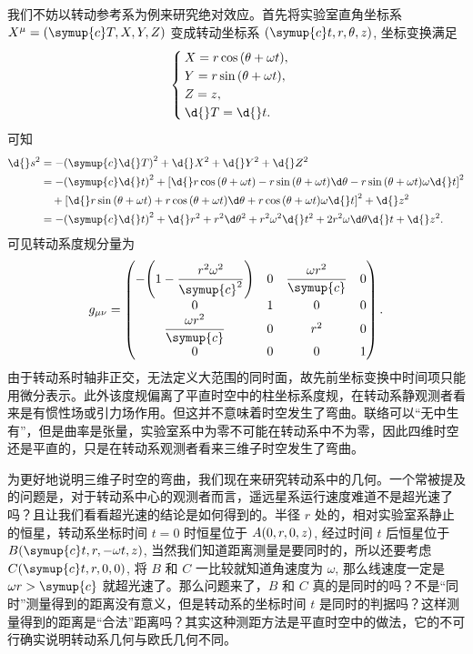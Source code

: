 \documentclass[UTF8, 12pt, a4paper, oneside, onecolumn, fontset=none]{ctexart}
\begin{document}
我们不妨以转动参考系为例来研究绝对效应。首先将实验室直角坐标系 $X^{\mu}=\mleft(\symup{c}T, X, Y, Z\mright)$ 变成转动坐标系 $\mleft(\symup{c}t, r,\theta, z\mright)$, 坐标变换满足
\begin{equation}
\begin{cases}
X=r\cos{\mleft(\theta+\omega t\mright)},\\
Y=r\sin{\mleft(\theta+\omega t\mright)},\\
Z=z,\\
\d{}T=\d{}t.
\end{cases}
\end{equation}
可知
\begin{align}
\d{}s^{2}&=-\mleft(\symup{c}\d{}T\mright)^{2}+\d{}X^{2}+\d{}Y^{2}+\d{}Z^{2}\notag\\
&=-\mleft(\symup{c}\d{}t\mright)^{2}+\mleft[\d{}r\cos{\mleft(\theta+\omega{}t\mright)}-r\sin{\mleft(\theta+\omega{}t\mright)}\d\theta-r\sin{\mleft(\theta+\omega{}t\mright)}\omega\d{}t\mright]^{2}\notag\\
&\quad+\mleft[\d{}r\sin{\mleft(\theta+\omega{}t\mright)}+r\cos{\mleft(\theta+\omega{}t\mright)}\d\theta+r\cos{\mleft(\theta+\omega t\mright)}\omega\d{}t\mright]^{2}+\d{}z^{2}\notag\\
&=-\mleft(\symup{c}\d{}t\mright)^{2}+\d{}r^{2}+r^{2}\d\theta^{2}+r^{2}\omega^{2}\d{} t^{2}+2r^{2}\omega\d\theta\d{}t+\d{}z^{2}.
\end{align}
可见转动系度规分量为
\begin{equation}
g_{\mu\nu}=\begin{pmatrix}
-\mleft(1-\dfrac{r^{2}\omega^{2}}{\symup{c}^{2}}\mright) & 0 & \dfrac{\omega r^{2}}{\symup{c}} & 0\\
0 & 1 & 0 & 0\\
\dfrac{\omega r^{2}}{\symup{c}} & 0 & r^{2} & 0\\
0 & 0 & 0 & 1\\
\end{pmatrix}.
\end{equation}
由于转动系时轴非正交，无法定义大范围的同时面，故先前坐标变换中时间项只能用微分表示。此外该度规偏离了平直时空中的柱坐标系度规，在转动系静观测者看来是有惯性场或引力场作用。但这并不意味着时空发生了弯曲。联络可以“无中生有”，但是曲率是张量，实验室系中为零不可能在转动系中不为零，因此四维时空还是平直的，只是在转动系观测者看来三维子时空发生了弯曲。

为更好地说明三维子时空的弯曲，我们现在来研究转动系中的几何。一个常被提及的问题是，对于转动系中心的观测者而言，遥远星系运行速度难道不是超光速了吗？且让我们看看超光速的结论是如何得到的。半径 $r$ 处的，相对实验室系静止的恒星，转动系坐标时间 $t=0$ 时恒星位于 $A\mleft(0, r, 0, z\mright)$, 经过时间 $t$ 后恒星位于 $B\mleft(\symup{c}t, r,-\omega t, z\mright)$, 当然我们知道距离测量是要同时的，所以还要考虑 $C\mleft(\symup{c}t, r, 0, 0\mright)$, 将 $B$ 和 $C$ 一比较就知道角速度为 $\omega$, 那么线速度一定是 $\omega r>\symup{c}$ 就超光速了。那么问题来了，$B$ 和 $C$ 真的是同时的吗？不是“同时”测量得到的距离没有意义，但是转动系的坐标时间 $t$ 是同时的判据吗？这样测量得到的距离是“合法”距离吗？其实这种测距方法是平直时空中的做法，它的不可行确实说明转动系几何与欧氏几何不同。
\end{document}
